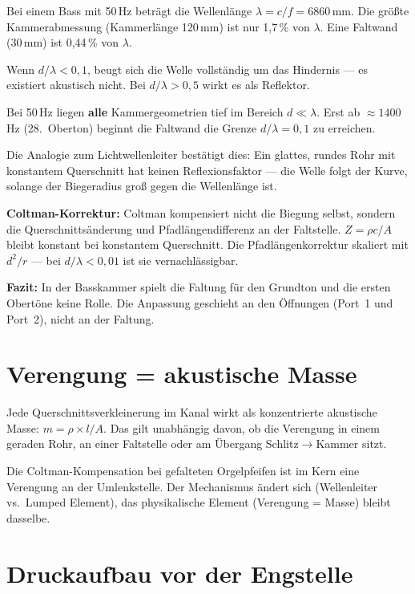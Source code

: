 \documentclass[11pt,a4paper]{article}
\begin{document}
Bei einem Bass mit 50\,Hz beträgt die Wellenlänge $\lambda = c/f = 6860$\,mm.
Die größte Kammerabmessung (Kammerlänge 120\,mm) ist nur 1,7\,\% von $\lambda$.
Eine Faltwand (30\,mm) ist 0,44\,\% von $\lambda$.

Wenn $d/\lambda < 0{,}1$, beugt sich die Welle vollständig um das Hindernis ---
es existiert akustisch nicht. Bei $d/\lambda > 0{,}5$ wirkt es als Reflektor.

Bei 50\,Hz liegen \textbf{alle} Kammergeometrien tief im Bereich $d \ll \lambda$.
Erst ab $\approx 1400$\,Hz (28.~Oberton) beginnt die Faltwand die Grenze
$d/\lambda = 0{,}1$ zu erreichen.

Die Analogie zum Lichtwellenleiter bestätigt dies: Ein glattes, rundes Rohr
mit konstantem Querschnitt hat keinen Reflexionsfaktor --- die Welle folgt
der Kurve, solange der Biegeradius groß gegen die Wellenlänge ist.

\textbf{Coltman-Korrektur:} Coltman kompensiert nicht die Biegung selbst,
sondern die Querschnittsänderung und Pfadlängendifferenz an der Faltstelle.
$Z = \rho c / A$ bleibt konstant bei konstantem Querschnitt.
Die Pfadlängenkorrektur skaliert mit $d^2/r$ --- bei $d/\lambda < 0{,}01$
ist sie vernachlässigbar.

\begin{tcolorbox}[colframe=keygreen, colback=green!5!white]
\textbf{Fazit:} In der Basskammer spielt die Faltung für den Grundton und die
ersten Obertöne keine Rolle. Die Anpassung geschieht an den Öffnungen
(Port~1 und Port~2), nicht an der Faltung.
\end{tcolorbox}

\section{Verengung = akustische Masse}

Jede Querschnittsverkleinerung im Kanal wirkt als konzentrierte akustische Masse:
$m = \rho \times l / A$. Das gilt unabhängig davon, ob die Verengung in einem
geraden Rohr, an einer Faltstelle oder am Übergang Schlitz$\to$Kammer sitzt.

Die Coltman-Kompensation bei gefalteten Orgelpfeifen ist im Kern eine
Verengung an der Umlenkstelle. Der Mechanismus ändert sich
(Wellenleiter vs.\ Lumped Element), das physikalische Element
(Verengung = Masse) bleibt dasselbe.

\section{Druckaufbau vor der Engstelle}
\end{document}
